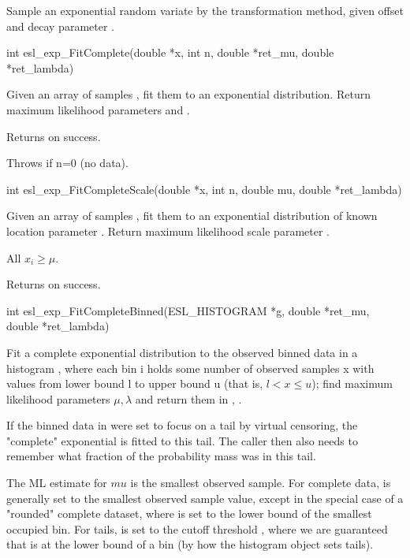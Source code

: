 \begin{sreapi}
Sample an exponential random variate
by the transformation method, given offset 
and decay parameter .


\hypertarget{func:esl_exp_FitComplete()}
{\item[int esl\_exp\_FitComplete(double *x, int n, double *ret\_mu, double *ret\_lambda)]}

Given an array of  samples , fit
them to an exponential distribution.
Return maximum likelihood parameters  and .

Returns  on success.

Throws  if n=0 (no data).



\hypertarget{func:esl_exp_FitCompleteScale()}
{\item[int esl\_exp\_FitCompleteScale(double *x, int n, double mu, double *ret\_lambda)]}

Given an array of  samples , fit
them to an exponential distribution of known location
parameter . Return maximum likelihood scale 
parameter . 

All $x_i \geq \mu$.

Returns  on success.



\hypertarget{func:esl_exp_FitCompleteBinned()}
{\item[int esl\_exp\_FitCompleteBinned(ESL\_HISTOGRAM *g, double *ret\_mu, double *ret\_lambda)]}

Fit a complete exponential distribution to the observed
binned data in a histogram , where each
bin i holds some number of observed samples x with values from 
lower bound l to upper bound u (that is, $l < x \leq u$);
find maximum likelihood parameters $\mu,\lambda$ and 
return them in , .

If the binned data in  were set to focus on 
a tail by virtual censoring, the "complete" exponential is 
fitted to this tail. The caller then also needs to
remember what fraction of the probability mass was in this
tail.

The ML estimate for $mu$ is the smallest observed
sample.  For complete data,  is generally set to
the smallest observed sample value, except in the
special case of a "rounded" complete dataset, where
 is set to the lower bound of the smallest
occupied bin. For tails,  is set to the cutoff
threshold , where we are guaranteed that  is
at the lower bound of a bin (by how the histogram
object sets tails). 


\end{sreapi}
